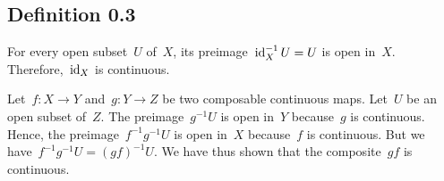 \subsection{Definition 0.3}

For every open subset~$U$ of~$X$, its preimage~$\operatorname{id}_X^{-1} U = U$ is open in~$X$.
Therefore,~$\operatorname{id}_X$ is continuous.

Let~$f \colon X \to Y$ and~$g \colon Y \to Z$ be two composable continuous maps.
Let~$U$ be an open subset of~$Z$.
The preimage~$g^{-1} U$ is open in~$Y$ because~$g$ is continuous.
Hence, the preimage~$f^{-1} g^{-1} U$ is open in~$X$ because~$f$ is continuous.
But we have~$f^{-1} g^{-1} U = (g f)^{-1} U$.
We have thus shown that the composite~$g f$ is continuous.
